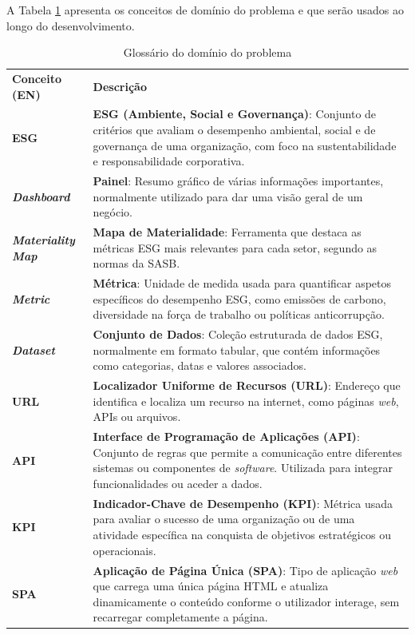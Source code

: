 A Tabela \ref{tab:glossario_dominio} apresenta os conceitos de domínio do problema e que serão usados ao longo do desenvolvimento.

\begin{table}[H]
    \renewcommand{\arraystretch}{1.2}
    \setlength{\tabcolsep}{10pt}
    \centering
    \begin{tabular}{>{\bfseries}p{4cm} p{11cm}}
        \rowcolor{purple!40}
        \textbf{Conceito (EN)} & \textbf{Descrição} \\
        ESG & \textbf{ESG (Ambiente, Social e Governança)}: Conjunto de critérios que avaliam o desempenho ambiental, social e de governança de uma organização, com foco na sustentabilidade e responsabilidade corporativa. \\
        \textit{Dashboard} & \textbf{Painel}: Resumo gráfico de várias informações importantes, normalmente utilizado para dar uma visão geral de um negócio. \\
        \textit{Materiality Map} & \textbf{Mapa de Materialidade}: Ferramenta que destaca as métricas ESG mais relevantes para cada setor, segundo as normas da SASB. \\
        \textit{Metric} & \textbf{Métrica}: Unidade de medida usada para quantificar aspetos específicos do desempenho ESG, como emissões de carbono, diversidade na força de trabalho ou políticas anticorrupção. \\
        \textit{Dataset} & \textbf{Conjunto de Dados}: Coleção estruturada de dados ESG, normalmente em formato tabular, que contém informações como categorias, datas e valores associados. \\
        URL & \textbf{Localizador Uniforme de Recursos (URL)}: Endereço que identifica e localiza um recurso na internet, como páginas \textit{web}, APIs ou arquivos. \\
        API & \textbf{Interface de Programação de Aplicações (API)}: Conjunto de regras que permite a comunicação entre diferentes sistemas ou componentes de \textit{software}. Utilizada para integrar funcionalidades ou aceder a dados. \\
        KPI & \textbf{Indicador-Chave de Desempenho (KPI)}: Métrica usada para avaliar o sucesso de uma organização ou de uma atividade específica na conquista de objetivos estratégicos ou operacionais. \\
        SPA & \textbf{Aplicação de Página Única (SPA)}: Tipo de aplicação \textit{web} que carrega uma única página HTML e atualiza dinamicamente o conteúdo conforme o utilizador interage, sem recarregar completamente a página. \\
    \end{tabular}
    \caption{Glossário do domínio do problema}
    \label{tab:glossario_dominio}
\end{table}

